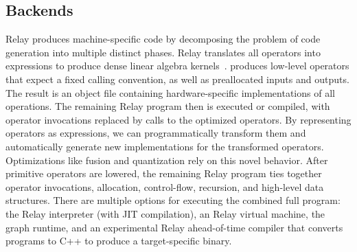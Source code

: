 \subsection*{Backends}

Relay produces machine-specific code
  by decomposing the problem of code generation into multiple distinct phases.
Relay translates all operators into \tvm expressions
  to produce dense linear algebra kernels~\citep{tvm_osdi18, tensor_comprehensions, halide}.
\tvm produces low-level operators that expect a fixed calling convention,
  as well as preallocated inputs and outputs.
The result is an object file containing hardware-specific implementations of all
  operations.
The remaining Relay program then is executed or compiled,
  with operator invocations replaced by calls to the optimized operators.
By representing operators as \tvm expressions, we can programmatically
  transform them and automatically generate new implementations for the transformed operators.
Optimizations like fusion and quantization
  rely on this novel behavior.
After primitive operators are lowered,
  the remaining Relay program ties
  together operator invocations, allocation, control-flow,
  recursion, and high-level data structures.
There are multiple options for executing the combined full program:
  the Relay interpreter (with JIT compilation),
  an Relay virtual machine,
  the \tvm graph runtime,
  and an experimental Relay ahead-of-time compiler
  that converts programs to C++ to produce a target-specific binary.




